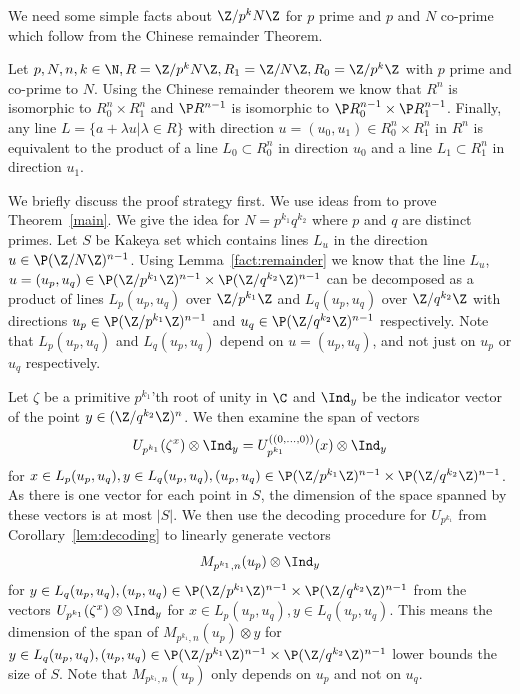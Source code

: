 We need some simple facts about $\Z/p^kN\Z$ for $p$ prime and $p$ and $N$ co-prime which follow from the Chinese remainder Theorem.

\begin{lem}[Geometry of $\Z/p^kN\Z$]\label{fact:remainder}
Let $p,N,n,k\in \N,R=\Z/p^kN\Z,R_1=\Z/N\Z,R_0=\Z/p^k\Z$ with $p$ prime and co-prime to $N$.  Using the Chinese remainder theorem we know that $R^n$ is isomorphic to $R_0^n\times R_1^n$ and $\P R^{n-1}$ is isomorphic to $\P R_0^{n-1}\times \P R_1^{n-1}$.  Finally, any line $L=\{a+\lambda u| \lambda \in R\}$ with direction $u=(u_0,u_1)\in R_0^{n} \times R_1^{n}$ in $R^n$ is equivalent to the product of a line $L_0\subset R_0^n$ in direction $u_0$ and a line $L_1\subset R_1^n$ in direction $u_1$. 
\end{lem}

We briefly discuss the proof strategy first. We use ideas from \cite{dhar2021proof} to prove Theorem~\ref{main}. We give the idea for $N=p^{k_1}q^{k_2}$ where $p$ and $q$ are distinct primes. Let $S$ be Kakeya set which contains lines $L_u$ in the direction $u\in \P(\Z/N\Z)^{n-1}$. Using Lemma~\ref{fact:remainder} we know that the line $L_u$, $u=(u_p,u_q)\in \P (\Z/p^{k_1}\Z)^{n-1}\times \P (\Z/q^{k_2}\Z)^{n-1}$ can be decomposed as a product of lines $L_p(u_p,u_q)$ over $\Z/p^{k_1}\Z$ and $L_q(u_p,u_q)$ over $\Z/q^{k_2}\Z$  with directions $u_p\in \P (\Z/p^{k_1}\Z)^{n-1}$ and $u_q\in\P (\Z/q^{k_2}\Z)^{n-1}$ respectively. Note that $L_p(u_p,u_q)$ and $L_q(u_p,u_q)$ depend on $u=(u_p,u_q)$, and not just on $u_p$ or $u_q$ respectively. 

Let $\zeta$ be a primitive $p^{k_1}$'th root of unity in $\C$ and $\Ind_y$ be the indicator vector of the point $y\in (\Z/q^{k_2}\Z)^n$. We then examine the span of vectors 
$$U_{p^{k_1}}(\zeta^x)\otimes \Ind_y=U^{((0,\hdots,0))}_{p^{k_1}}(x)\otimes \Ind_y$$
for $x\in L_p(u_p,u_q),y\in L_q(u_p,u_q),(u_p,u_q)\in \P (\Z/p^{k_1}\Z)^{n-1}\times \P (\Z/q^{k_2}\Z)^{n-1}$. As there is one vector for each point in $S$, the dimension of the space spanned by these vectors is at most $|S|$. We then use the decoding procedure for $U_{p^{k_1}}$ from Corollary~\ref{lem:decoding} to linearly generate vectors 
$$M_{p^{k_1},n}(u_p)\otimes \Ind_y$$
for $y\in L_q(u_p,u_q),(u_p,u_q)\in \P (\Z/p^{k_1}\Z)^{n-1}\times \P (\Z/q^{k_2}\Z)^{n-1}$ from the vectors $U_{p^{k_1}}(\zeta^x)\otimes \Ind_y$ for $x\in L_p(u_p,u_q),y\in L_q(u_p,u_q)$. This means the dimension of the span of $M_{p^{k_1},n}(u_p)\otimes y$ for $y\in L_q(u_p,u_q),(u_p,u_q)\in \P (\Z/p^{k_1}\Z)^{n-1}\times \P (\Z/q^{k_2}\Z)^{n-1}$ lower bounds the size of $S$. Note that $M_{p^{k_1},n}(u_p)$ only depends on $u_p$ and not on $u_q$.

